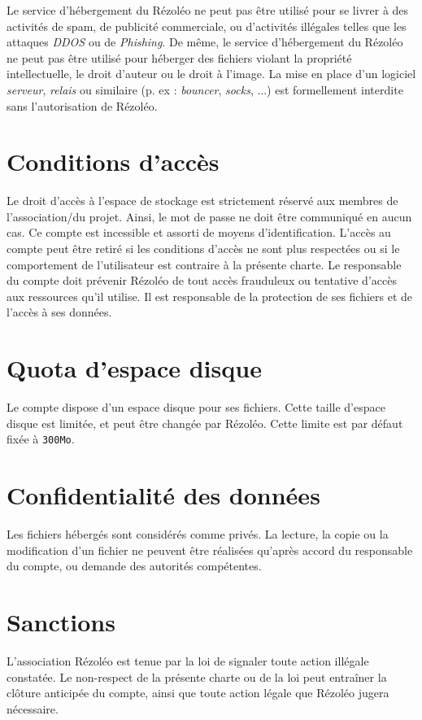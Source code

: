 \documentclass[12pt, a4paper]{article}
\begin{document}
Le service d'hébergement du Rézoléo ne peut pas être utilisé pour se livrer à des activités de spam, de publicité commerciale, ou d'activités illégales telles que les attaques \textit{DDOS} ou de \textit{Phishing}. De même, le service d'hébergement du Rézoléo ne peut pas être utilisé pour héberger des fichiers violant la propriété intellectuelle, le droit d'auteur ou le droit à l'image. La mise en place d'un logiciel \textit{serveur}, \textit{relais} ou similaire (p. ex : \textit{bouncer}, \textit{socks}, ...) est formellement interdite sans l'autorisation de Rézoléo.

\section{Conditions d'accès}
Le droit d'accès à l'espace de stockage est strictement réservé aux membres de l'association/du projet. Ainsi, le mot de passe ne doit être communiqué en aucun cas. Ce compte est incessible et assorti de moyens d'identification. L'accès au compte peut être retiré si les conditions d'accès ne sont plus respectées ou si le comportement de l'utilisateur est contraire à la présente charte. Le responsable du compte doit prévenir Rézoléo de tout accès frauduleux ou tentative d'accès aux ressources qu'il utilise. Il est responsable de la protection de ses fichiers et de l'accès à ses données.

\section{Quota d'espace disque}
Le compte dispose d'un espace disque pour ses fichiers. Cette taille d'espace disque est limitée, et peut être changée par Rézoléo. Cette limite est par défaut fixée à \texttt{300Mo}.

\section{Confidentialité des données}
Les fichiers hébergés sont considérés comme privés. La lecture, la copie ou la modification d'un fichier ne peuvent être réalisées qu'après accord du responsable du compte, ou demande des autorités compétentes.

\section{Sanctions}
L'association Rézoléo est tenue par la loi de signaler toute action illégale constatée. Le non-respect de la présente charte ou de la loi peut entraîner la clôture anticipée du compte, ainsi que toute action légale que Rézoléo jugera nécessaire.
\end{document}
